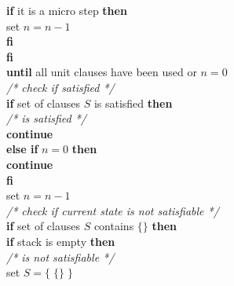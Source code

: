 \begin{listing}[h!]
                    \hspace*{2cm} \textbf{if} it is a micro step \textbf{then}\\
                        \hspace*{2.5cm} set $n = n - 1$\\
                    \hspace*{2cm} \textbf{fi}\\
                \hspace*{1.5cm} \textbf{fi}\\
            \hspace*{1.0cm} \textbf{until} all unit clauses have been used or $n = 0$\\
            \hspace*{1.0cm} \textit{/* check if satisfied */}\\
            \hspace*{1.0cm} \textbf{if} set of clauses $S$ is satisfied \textbf{then}\\
                \hspace*{1.5cm} \textit{/* is satisfied */}\\
                \hspace*{1.5cm} \textbf{continue}\\
            \hspace*{1.0cm} \textbf{else if} $n = 0$ \textbf{then}\\
                \hspace*{1.5cm} \textbf{continue}\\
            \hspace*{1.0cm} \textbf{fi}\\
            \hspace*{1.0cm} set $n = n - 1$\\
            \hspace*{1.0cm} \textit{/* check if current state is not satisfiable */}\\
            \hspace*{1.0cm} \textbf{if} set of clauses $S$ contains $\{\}$ \textbf{then}\\
                \hspace*{1.5cm} \textbf{if} stack is empty \textbf{then}\\
                    \hspace*{2cm} \textit{/* is not satisfiable */}\\
                    \hspace*{2cm} set $S = \{\;\{\}\;\}$\\

\end{listing}
